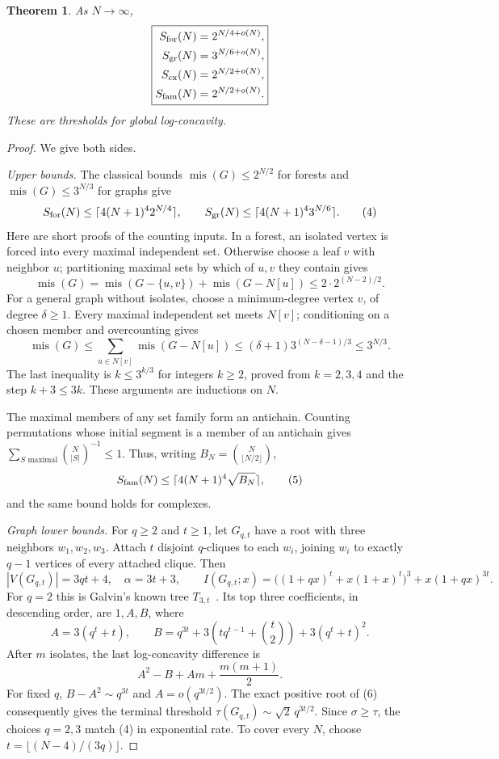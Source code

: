 \documentclass[11pt]{article}
\newtheorem{theorem}{Theorem}
\newcommand{\mis}{\operatorname{mis}}
\begin{document}
\begin{theorem}\label{thm:rates}
As $N\to\infty$,
\[
 \boxed{\begin{aligned}
 S_{\rm for}(N)&=2^{N/4+o(N)},\\
 S_{\rm gr}(N)&=3^{N/6+o(N)},\\
 S_{\rm cx}(N)&=2^{N/2+o(N)},\\
 S_{\rm fam}(N)&=2^{N/2+o(N)}.
 \end{aligned}}
\]
These are thresholds for global log-concavity.
\end{theorem}
\begin{proof}
We give both sides.

\smallskip\noindent\textit{Upper bounds.}
The classical bounds $\mis(G)\le2^{N/2}$ for forests and
$\mis(G)\le3^{N/3}$ for graphs give
\[
 S_{\rm for}(N)\le\lceil4(N+1)^4 2^{N/4}\rceil,\qquad
 S_{\rm gr}(N)\le\lceil4(N+1)^4 3^{N/6}\rceil.
\tag{4}
\]
Here are short proofs of the counting inputs. In a forest, an isolated
vertex is forced into every maximal independent set. Otherwise choose
a leaf $v$ with neighbor $u$; partitioning maximal sets by which of
$u,v$ they contain gives
\[
 \mis(G)=\mis(G-\{u,v\})+\mis(G-N[u])\le2\cdot2^{(N-2)/2}.
\]
For a general graph without isolates, choose a minimum-degree vertex
$v$, of degree $\delta\ge1$. Every maximal independent set meets $N[v]$;
conditioning on a chosen member and overcounting gives
\[
 \mis(G)\le\sum_{u\in N[v]}\mis(G-N[u])
 \le(\delta+1)3^{(N-\delta-1)/3}\le3^{N/3}.
\]
The last inequality is $k\le3^{k/3}$ for integers $k\ge2$, proved from
$k=2,3,4$ and the step $k+3\le3k$. These arguments are inductions on $N$.

The maximal members of any set family form an antichain. Counting
permutations whose initial segment is a member of an antichain gives
$\sum_{S\text{ maximal}}\binom N{|S|}^{-1}\le1$. Thus, writing
$B_N=\binom N{\lfloor N/2\rfloor}$,
\[
 S_{\rm fam}(N)\le\lceil4(N+1)^4\sqrt{B_N}\rceil,
\tag{5}
\]
and the same bound holds for complexes.

\smallskip\noindent\textit{Graph lower bounds.}
For $q\ge2$ and $t\ge1$, let $G_{q,t}$ have a root with three neighbors
$w_1,w_2,w_3$. Attach $t$ disjoint $q$-cliques to each $w_i$, joining
$w_i$ to exactly $q-1$ vertices of every attached clique. Then
\[
 |V(G_{q,t})|=3qt+4,\quad \alpha=3t+3,\qquad
 I(G_{q,t};x)=\big((1+qx)^t+x(1+x)^t\big)^3+x(1+qx)^{3t}.
\]
For $q=2$ this is Galvin's known tree $T_{3,t}$~\cite{G}.
Its top three coefficients, in descending order, are $1,A,B$, where
\[
 A=3(q^t+t),\qquad
 B=q^{3t}+3\left(tq^{t-1}+\binom t2\right)+3(q^t+t)^2.
\]
After $m$ isolates, the last log-concavity difference is
\[
 A^2-B+Am+\frac{m(m+1)}2.
\tag{6}
\]
For fixed $q$, $B-A^2\sim q^{3t}$ and $A=o(q^{3t/2})$.
The exact positive root of (6) consequently gives the terminal threshold
$\tau(G_{q,t})\sim\sqrt2\,q^{3t/2}$. Since $\sigma\ge\tau$, the
choices $q=2,3$ match (4) in exponential rate.
To cover every $N$, choose $t=\lfloor(N-4)/(3q)\rfloor$.


\end{proof}
\end{document}

